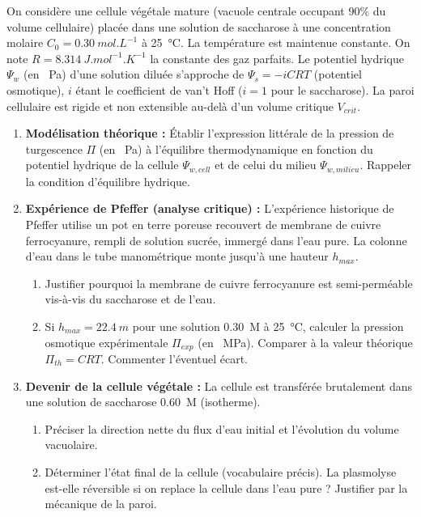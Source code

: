 \documentclass[11pt]{article}
\begin{document}
\begin{exercice}
On considère une cellule végétale mature (vacuole centrale occupant 90\% du volume cellulaire) placée dans une solution de saccharose  à une concentration molaire $C_0 = \SI{0,30}{mol.L^{-1}}$ à \SI{25}{\celsius}. La température est maintenue constante. On note $R = \SI{8,314}{J.mol^{-1}.K^{-1}}$ la constante des gaz parfaits. Le potentiel hydrique $\Psi_w$ (en \SI{}{Pa}) d'une solution diluée s'approche de $\Psi_s = -iCRT$ (potentiel osmotique), $i$ étant le coefficient de van't Hoff ($i=1$ pour le saccharose). La paroi cellulaire est rigide et non extensible au-delà d'un volume critique $V_{crit}$.
\begin{enumerate}
    \item \textbf{Modélisation théorique :} Établir l'expression littérale de la pression de turgescence $\Pi$ (en \SI{}{Pa}) à l'équilibre thermodynamique en fonction du potentiel hydrique de la cellule $\Psi_{w,cell}$ et de celui du milieu $\Psi_{w,milieu}$. Rappeler la condition d'équilibre hydrique.
    \item \textbf{Expérience de Pfeffer (analyse critique) :} L'expérience historique de Pfeffer utilise un pot en terre poreuse recouvert de membrane de cuivre ferrocyanure, rempli de solution sucrée, immergé dans l'eau pure. La colonne d'eau dans le tube manométrique monte jusqu'à une hauteur $h_{max}$. 
    \begin{enumerate}
        \item Justifier pourquoi la membrane de cuivre ferrocyanure est semi-perméable vis-à-vis du saccharose et de l'eau.
        \item Si $h_{max} = \SI{22,4}{m}$ pour une solution \SI{0,30}{M} à \SI{25}{\celsius}, calculer la pression osmotique expérimentale $\Pi_{exp}$ (en \SI{}{MPa}). Comparer à la valeur théorique $\Pi_{th} = CRT$. Commenter l'éventuel écart.
    \end{enumerate}
    \item \textbf{Devenir de la cellule végétale :} La cellule est transférée brutalement dans une solution de saccharose \SI{0,60}{M} (isotherme). 
    \begin{enumerate}
        \item Préciser la direction nette du flux d'eau initial et l'évolution du volume vacuolaire. 
        \item Déterminer l'état final de la cellule (vocabulaire précis). La plasmolyse est-elle réversible si on replace la cellule dans l'eau pure ? Justifier par la mécanique de la paroi.

\end{enumerate}
\end{enumerate}
\end{exercice}
\end{document}
